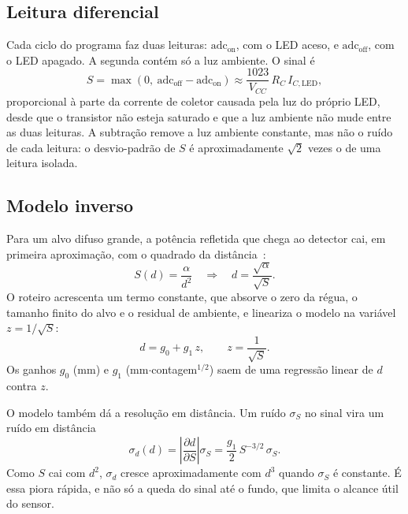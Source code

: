 \documentclass[11pt,a4paper]{article}
\begin{document}
\subsection{Leitura diferencial}

Cada ciclo do programa faz duas leituras: $\text{adc}_\text{on}$, com o LED aceso, e $\text{adc}_\text{off}$, com o LED apagado. A segunda contém só a luz ambiente. O sinal é
\begin{equation}
S = \max\left(0,\ \text{adc}_\text{off} - \text{adc}_\text{on}\right)
\approx \frac{1023}{V_{CC}}\, R_C\, I_{C,\text{LED}},
\label{eq:sinal}
\end{equation}
proporcional à parte da corrente de coletor causada pela luz do próprio LED, desde que o transistor não esteja saturado e que a luz ambiente não mude entre as duas leituras. A subtração remove a luz ambiente constante, mas não o ruído de cada leitura: o desvio-padrão de $S$ é aproximadamente $\sqrt{2}$ vezes o de uma leitura isolada.

\subsection{Modelo inverso}
\label{sec:fund-modelo}

Para um alvo difuso grande, a potência refletida que chega ao detector cai, em primeira aproximação, com o quadrado da distância~\cite{roteiro}:
\begin{equation}
S(d) = \frac{\alpha}{d^2}
\quad\Longrightarrow\quad
d = \frac{\sqrt{\alpha}}{\sqrt{S}} .
\end{equation}
O roteiro acrescenta um termo constante, que absorve o zero da régua, o tamanho finito do alvo e o residual de ambiente, e lineariza o modelo na variável $z = 1/\sqrt{S}$:
\begin{equation}
d = g_0 + g_1\, z, \qquad z = \frac{1}{\sqrt{S}} .
\label{eq:modelo}
\end{equation}
Os ganhos $g_0$ (mm) e $g_1$ (mm$\cdot$contagem$^{1/2}$) saem de uma regressão linear de $d$ contra $z$.

O modelo também dá a resolução em distância. Um ruído $\sigma_S$ no sinal vira um ruído em distância
\begin{equation}
\sigma_d(d) = \left|\frac{\partial d}{\partial S}\right| \sigma_S
= \frac{g_1}{2}\, S^{-3/2}\, \sigma_S .
\label{eq:sigmad}
\end{equation}
Como $S$ cai com $d^2$, $\sigma_d$ cresce aproximadamente com $d^3$ quando $\sigma_S$ é constante. É essa piora rápida, e não só a queda do sinal até o fundo, que limita o alcance útil do sensor.
\end{document}

